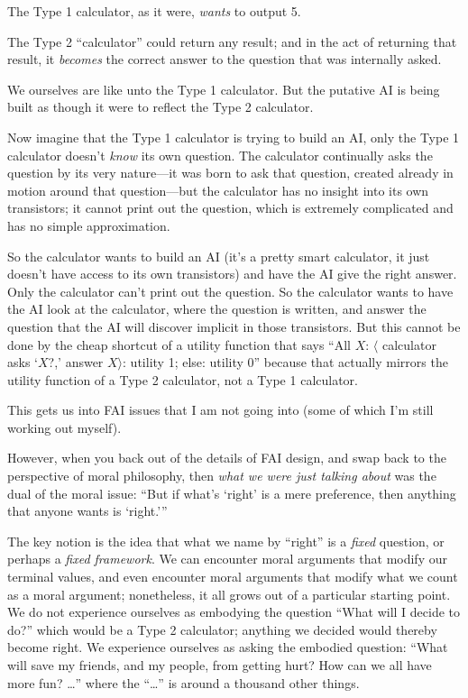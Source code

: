 {
 The Type 1 calculator, as it were, \textit{wants} to output 5.}

{
 The Type 2 ``calculator'' could
return any result; and in the act of returning that result, it
\textit{becomes} the correct answer to the question that was internally
asked.}

{
 We ourselves are like unto the Type 1 calculator. But the putative
AI is being built as though it were to reflect the Type 2 calculator.}

{
 Now imagine that the Type 1 calculator is trying to build an AI,
only the Type 1 calculator doesn't \textit{know} its
own question. The calculator continually asks the question by its very
nature---it was born to ask that question, created already in motion
around that question---but the calculator has no insight into its own
transistors; it cannot print out the question, which is extremely
complicated and has no simple approximation.}

{
 So the calculator wants to build an AI (it's a
pretty smart calculator, it just doesn't have access to
its own transistors) and have the AI give the right answer. Only the
calculator can't print out the question. So the
calculator wants to have the AI look at the calculator, where the
question is written, and answer the question that the AI will discover
implicit in those transistors. But this cannot be done by the cheap
shortcut of a utility function that says ``All $X$:
$\langle$ calculator asks
`$X$?,' answer
$X$$\rangle$: utility 1; else: utility
0'' because that actually mirrors the utility
function of a Type 2 calculator, not a Type 1 calculator.}

{
 This gets us into FAI issues that I am not going into (some of
which I'm still working out myself).}

{
 However, when you back out of the details of FAI design, and swap
back to the perspective of moral philosophy, then \textit{what we were
just talking about} was the dual of the moral issue:
``But if what's
`right' is a mere preference, then
anything that anyone wants is
`right.'''}

{
 The key notion is the idea that what we name by
``right'' is a \textit{fixed}
question, or perhaps a \textit{fixed framework}. We can encounter moral
arguments that modify our terminal values, and even encounter moral
arguments that modify what we count as a moral argument; nonetheless,
it all grows out of a particular starting point. We do not experience
ourselves as embodying the question ``What will I
decide to do?'' which would be a Type 2 calculator;
anything we decided would thereby become right. We experience ourselves
as asking the embodied question: ``What will save my
friends, and my people, from getting hurt? How can we all have more
fun? \ldots'' where the
``\ldots'' is around a thousand other
things.}

